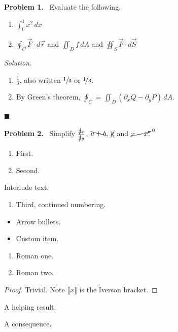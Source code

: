 \documentclass[11pt]{article}
\newenvironment{problem}[1]{\noindent\textbf{Problem #1.}\ }{\par\medskip}
\newenvironment{solution}{\noindent\textit{Solution.}\ }{\hfill$\blacksquare$\par\bigskip}
\begin{document}
\begin{problem}{1}
Evaluate the following.
\begin{enumerate}[label=(\alph*)]
  \item $\displaystyle\int_0^1 x^2\,dx$
  \item $\displaystyle\oint_C \vec{F}\cdot d\vec{r}$ and $\iint_D f\,dA$ and $\oiint_S \vec{F}\cdot d\vec{S}$
\end{enumerate}
\end{problem}

\begin{solution}
\begin{enumerate}[label=(\alph*), noitemsep]
  \item $\frac{1}{3}$, also written $\sfrac{1}{3}$ or $\nicefrac{1}{3}$.
  \item By Green's theorem, $\oint_C = \iint_D (\partial_x Q - \partial_y P)\,dA$.
\end{enumerate}
\end{solution}

\begin{problem}{2}
Simplify $\frac{\cancel{3}x}{\cancel{3}y}$, $\bcancel{a+b}$, $\xcancel{c}$ and $\cancelto{0}{x - x}$.
\end{problem}

\begin{enumerate}[label=\textbf{\arabic*.}, start=3]
  \item First.
  \item Second.
\end{enumerate}
Interlude text.
\begin{enumerate}[resume]
  \item Third, continued numbering.
\end{enumerate}

\begin{itemize}[label=$\triangleright$]
  \item Arrow bullets.
  \item[$\star$] Custom item.
\end{itemize}

\begin{enumerate}[label=\roman*)]
\item Roman one.
\item Roman two.
\end{enumerate}

\begin{proof}
Trivial. Note $\llbracket x \rrbracket$ is the Iverson bracket.
\end{proof}

\begin{description}[style=nextline]
\item[Lemma] A helping result.
\item[Corollary] A consequence.
\end{description}
\end{document}
